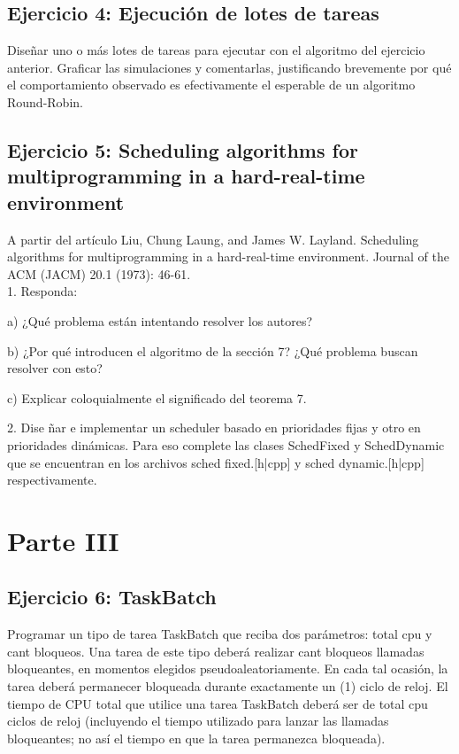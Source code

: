 \documentclass[a4paper]{article}
\begin{document}
 \subsection{Ejercicio 4: Ejecuci\'on de lotes de tareas}
 
Dise\~nar uno o m\'as lotes de tareas para ejecutar con el algoritmo del ejercicio anterior. Graficar las simulaciones y comentarlas, justificando brevemente por qu\'e el comportamiento observado es efectivamente el esperable de un algoritmo Round-Robin.

 \subsection{Ejercicio 5: Scheduling algorithms for multiprogramming in a hard-real-time environment}
 
A partir del art\'iculo Liu, Chung Laung, and James W. Layland. Scheduling algorithms for multiprogramming in a hard-real-time environment. Journal of the ACM (JACM) 20.1 (1973): 46-61.\\


1. Responda:

a) ¿Qu\'e problema est\'an intentando resolver los autores?

b) ¿Por qu\'e introducen el algoritmo de la secci\'on 7? ¿Qu\'e problema buscan resolver con esto?

c) Explicar coloquialmente el significado del teorema 7.

2. Dise \~nar e implementar un scheduler basado en prioridades fijas y otro en prioridades din\'amicas. Para eso complete las clases SchedFixed y SchedDynamic que se encuentran en los archivos sched fixed.[h|cpp] y sched dynamic.[h|cpp] respectivamente.




\section{Parte III}


 \subsection{Ejercicio 6: TaskBatch}
Programar un tipo de tarea TaskBatch que reciba dos par\'ametros: total cpu y cant bloqueos. Una tarea de este tipo deber\'a realizar cant bloqueos llamadas bloqueantes, en momentos elegidos pseudoaleatoriamente. En cada tal ocasi\'on, la tarea deber\'a permanecer bloqueada durante exactamente un (1) ciclo de reloj. El tiempo de CPU total que utilice una
tarea TaskBatch deber\'a ser de total cpu ciclos de reloj (incluyendo el tiempo utilizado para lanzar las llamadas bloqueantes; no as\'i el tiempo en que la tarea permanezca bloqueada).
\end{document}
